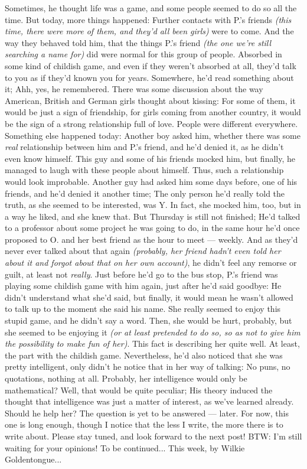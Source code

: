 Sometimes, he thought life was a game, and some people seemed to do so all the time. 
But today, more things happened: Further contacts with P.'s friends \emph{(this time, there were more of them, and they'd all been girls)} were to come. 
And the way they behaved told him, that the things P.'s friend \emph{(the one we're still searching a name for)} did were normal for this group of people. 
Absorbed in some kind of childish game, and even if they weren't absorbed at all, they'd talk to you as if they'd known you for years. Somewhere, he'd read something about it; Ahh, yes, he remembered. There was some discussion about the way American, British and German girls thought about kissing: For some of them, it would be just a sign of friendship, for girls coming from another country, it would be the sign of a strong relationship full of love. 
People were different everywhere. 
Something else happened today: Another boy asked him, whether there was some \emph{real} relationship between him and P.'s friend, and he'd denied it, as he didn't even know himself. This guy and some of his friends mocked him, but finally, he managed to laugh with these people about himself. Thus, such a relationship would look improbable. 
Another guy had asked him some days before, one of his friends, and he'd denied it another time; The only person he'd really told the truth, as she seemed to be interested, was Y. 
In fact, she mocked him, too, but in a way he liked, and she knew that. 
But Thursday is still not finished; He'd talked to a professor about some project he was going to do, in the same hour he'd once proposed to O. and her best friend as the hour to meet --- weekly. And as they'd never ever talked about that again \emph{(probably, her friend hadn't even told her about it and forgot about that on her own account)}, he didn't feel any remorse or guilt, at least not \emph{really}. 
Just before he'd go to the bus stop, P.'s friend was playing some childish game with him again, just after he'd said goodbye: He didn't understand what she'd said, but finally, it would mean he wasn't allowed to talk up to the moment she said his name. 
She really seemed to enjoy this stupid game, and he didn't say a word. Then, she would be hurt, probably, but she seemed to be enjoying it \emph{(or at least pretended to do so, so as not to give him the possibility to make fun of her)}. 
This fact is describing her quite well. 
At least, the part with the childish game. 
Nevertheless, he'd also noticed that she was pretty intelligent, only didn't he notice that in her way of talking: No puns, no quotations, nothing at all. 
Probably, her intelligence would only be mathematical?
Well, that would be quite peculiar; His theory induced the thought that intelligence was just a matter of interest, as we've learned already. Should he help her?
The question is yet to be answered --- later. 
For now, this one is long enough, though I notice that the less I write, the more there is to write about. 
Please stay tuned, and look forward to the next post!
BTW: I'm still waiting for your opinions!
To be continued...
This week, by Wilkie Goldentongue...

